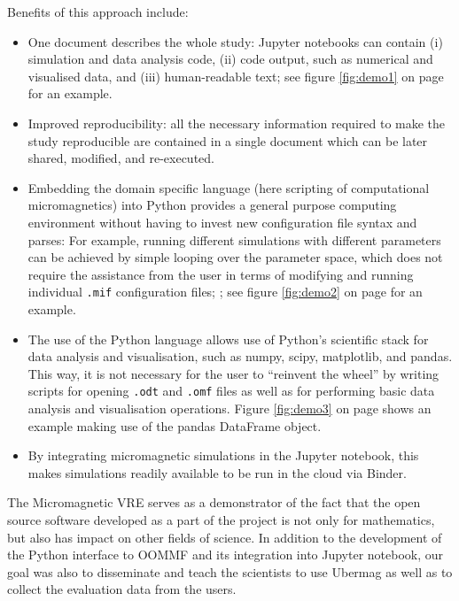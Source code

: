 \documentclass{deliverablereport}
\begin{document}
Benefits of this approach include:
\begin{itemize}
\item One document describes the whole study: Jupyter notebooks can
  contain (i) simulation and data analysis code, (ii) code output,
  such as numerical and visualised data, and (iii) human-readable
  text; see figure \ref{fig:demo1} on page \pageref{fig:demo1} for an example.
\item Improved reproducibility: all the necessary
information required to make the study reproducible are contained in a
single document which can be later shared, modified, and
re-executed.
\item Embedding the domain specific language (here scripting of
  computational micromagnetics) into Python provides a general purpose
  computing environment without having to invest new configuration
  file syntax and parses: For example, running different simulations
  with different parameters can be achieved by simple looping over the
  parameter space, which does not require the assistance from the user
  in terms of modifying and running individual \texttt{.mif}
  configuration files; ; see figure \ref{fig:demo2} on page
  \pageref{fig:demo2} for an example.
\item The use of the Python language allows use of Python's scientific
stack for data analysis and visualisation, such as numpy, scipy,
matplotlib, and pandas. This way, it is not
necessary for the user to ``reinvent the wheel'' by writing scripts
for opening \texttt{.odt} and \texttt{.omf} files as well as for
performing basic data analysis and visualisation operations. Figure \ref{fig:demo3} on page
  \pageref{fig:demo3} shows an example making use of the pandas
  DataFrame object.
\item By integrating micromagnetic simulations in the Jupyter notebook, this
makes simulations readily available to be run in the cloud via
Binder.
\end{itemize}

The Micromagnetic VRE serves as a demonstrator of the fact
that the open source software developed as a part of the \ODK project
is not only for mathematics, but also has impact on other fields of
science. In addition to the development of the Python interface to
OOMMF and its integration into Jupyter notebook, our goal was also to
disseminate and teach the scientists to use Ubermag as well as to
collect the evaluation data from the users.
\end{document}
